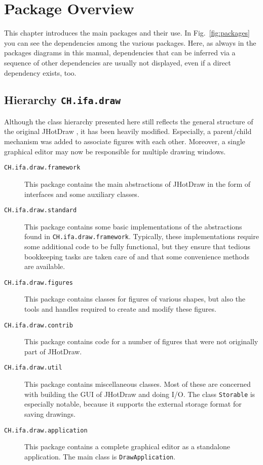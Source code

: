 \chapter{Package Overview}\label{chap:overview}

This chapter introduces the main packages and their use.
In Fig.~\ref{fig:packages} you can see the dependencies
among the various packages. Here, as always in the packages
diagrams in this manual, dependencies that can be inferred
via a sequence of other dependencies are usually not displayed,
even if a direct dependency exists, too.



\section{Hierarchy \texttt{CH.ifa.draw}}

Although the class hierarchy
presented here still reflects the general
structure of the original JHotDraw \cite{Gamma98}, it has been heavily
modified. Especially, a parent/child mechanism was added
to associate figures with each other. Moreover, a single graphical
editor may now be responsible for multiple drawing windows.

\begin{description}
\item[\texttt{CH.ifa.draw.framework}] 
  This package contains the main abstractions of JHotDraw 
  in the form of interfaces and some auxiliary classes.
\item[\texttt{CH.ifa.draw.standard}] 
  This package contains some basic implementations of the
  abstractions found in \texttt{CH.ifa.draw.framework}.
  Typically, these implementations require some additional 
  code to be fully functional, but they ensure that tedious
  bookkeeping tasks are taken care of and that some convenience
  methods are available.
\item[\texttt{CH.ifa.draw.figures}]
  This package contains classes for figures of various shapes, but also
  the tools and handles required to create and modify these
  figures.
\item[\texttt{CH.ifa.draw.contrib}] 
  This package contains code for a number of figures that
  were not originally part of JHotDraw.
\item[\texttt{CH.ifa.draw.util}] 
  This package contains miscellaneous classes. Most of these are
  concerned with building the GUI of JHotDraw and doing I/O.
  The class \texttt{Storable} is especially notable, because it
  supports the external storage format for saving drawings.
\item[\texttt{CH.ifa.draw.application}]
  This package contains a complete graphical editor as
  a stand\-alone application. The main class is \texttt{DrawApplication}.
\end{description}

